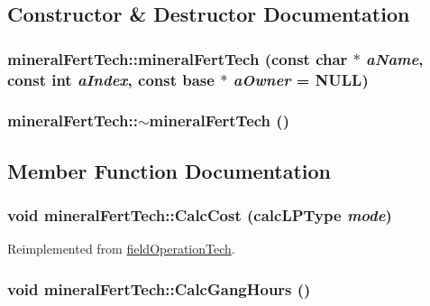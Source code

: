 \subsection{Constructor \& Destructor Documentation}
\hypertarget{classmineral_fert_tech_a674bb0d21206f21d0f1be4dfb2f51c23}{
\subsubsection[{mineralFertTech}]{\setlength{\rightskip}{0pt plus 5cm}mineralFertTech::mineralFertTech (const char $\ast$ {\em aName}, \/  const int {\em aIndex}, \/  const {\bf base} $\ast$ {\em aOwner} = {\ttfamily NULL})}}
\label{classmineral_fert_tech_a674bb0d21206f21d0f1be4dfb2f51c23}
\hypertarget{classmineral_fert_tech_a50a838abe5a9ada44346633c11f9df65}{
\subsubsection[{$\sim$mineralFertTech}]{\setlength{\rightskip}{0pt plus 5cm}mineralFertTech::$\sim$mineralFertTech ()}}
\label{classmineral_fert_tech_a50a838abe5a9ada44346633c11f9df65}


\subsection{Member Function Documentation}
\hypertarget{classmineral_fert_tech_a0b0d6226496238a9c11637a3c70429ee}{
\subsubsection[{CalcCost}]{\setlength{\rightskip}{0pt plus 5cm}void mineralFertTech::CalcCost ({\bf calcLPType} {\em mode})}}
\label{classmineral_fert_tech_a0b0d6226496238a9c11637a3c70429ee}


Reimplemented from \hyperlink{classfield_operation_tech_a908e81a53479de1a6768d58964dbc57c}{fieldOperationTech}.\hypertarget{classmineral_fert_tech_a60aff267f8d7906833524bbd0edcc39b}{
\subsubsection[{CalcGangHours}]{\setlength{\rightskip}{0pt plus 5cm}void mineralFertTech::CalcGangHours ()}}
\label{classmineral_fert_tech_a60aff267f8d7906833524bbd0edcc39b}


